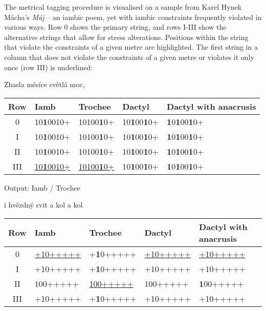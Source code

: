 The metrical tagging procedure is visualised on a sample from Karel Hynek Mácha's \emph{Máj} -- an iambic poem, yet with iambic constraints frequently violated in various ways. Row 0 shows the primary string, and rows I-III show the alternative strings that allow for stress alterations. Positions within the string that violate the constraints of a given metre are highlighted. The first string in a column that does not violate the constraints of a given metre or violates it only once (row III) is underlined:

\pagebreak

Zhasla měsíce světlá moc,\\
\begin{center}
\begin{tabular}{c||m{2.5cm}|m{2.5cm}|m{2.5cm}|m{3.5cm}}
    Row & Iamb & Trochee & Dactyl & Dactyl with anacrusis\\\hline\hline
    0 & 10\textbf{1}0010+ & 10100\textbf{1}0+ & 10\textbf{1}00\textbf{1}0+ & \textbf{1}0\textbf{1}00\textbf{1}0+\\
    I & 10\textbf{1}0010+ & 10100\textbf{1}0+ & 10\textbf{1}00\textbf{1}0+ & \textbf{1}0\textbf{1}00\textbf{1}0+\\
    II & 10\textbf{1}0010+ & 10100\textbf{1}0+ & 10\textbf{1}00\textbf{1}0+ & \textbf{1}0\textbf{1}00\textbf{1}0+\\
    III & \underline{10\textbf{1}0010+} & \underline{10100\textbf{1}0+} & 10\textbf{1}00\textbf{1}0+ & \textbf{1}0\textbf{1}00\textbf{1}0+\\
\end{tabular}
\end{center}

Output: Iamb / Trochee

i hvězdný svit a kol a kol\\
\begin{center}
\begin{tabular}{c||m{2.5cm}|m{2.5cm}|m{2.5cm}|m{3.5cm}}
    Row & Iamb & Trochee & Dactyl & Dactyl with anacrusis\\\hline\hline
    0 & \underline{+10+++++} & +\textbf{1}0+++++ & \underline{+10+++++} & \underline{+10+++++}\\
    I & +10+++++ & +\textbf{1}0+++++ & +10+++++ & +10+++++\\
    II & 100+++++ & \underline{100+++++} & 100+++++ & \textbf{1}00+++++\\
    III & +10+++++ & +\textbf{1}0+++++ & +10+++++ & +10+++++\\
\end{tabular}
\end{center}


